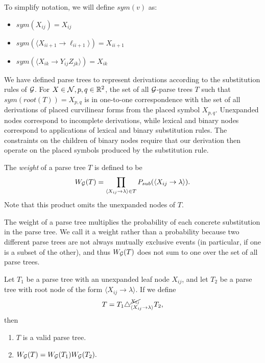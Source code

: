 To simplify notation, we will define $sym(v)$ as:
\begin{itemize}
\item $sym(X_{ij}) = X_{ij}$
\item $sym(\langle X_{i i+1} \to \ell_{i i+1}\rangle) = X_{i i+1}$
\item $sym(\langle X_{ik} \to Y_{ij} Z_{jk}\rangle) = X_{i k}$
\end{itemize}

We have defined parse trees to represent derivations according to the
substitution rules of ${\mathcal G}$.  For $X\in {\mathcal N}, p,q\in \mathbb{R}^2$, the set
of all ${\mathcal G}$-parse trees $T$ such that $sym(root(T)) = X_{p,q}$ is in
one-to-one correspondence with the set of all derivations of placed
curvilinear forms from the placed symbol $X_{p,q}$. Unexpanded nodes
correspond to incomplete derivations, while lexical and binary nodes
correspond to applications of lexical and binary substitution
rules. The constraints on the children of binary nodes require that
our derivation then operate on the placed symbols produced by the
substitution rule.

\begin{defn}
The \emph{weight} of a parse tree $T$ is defined to be
$$ W_{{\mathcal G}}(T) = \prod_{\langle X_{ij} \to \lambda \rangle\in T} P_{sub}(
\langle X_{ij} \to \lambda \rangle).$$ Note that this product omits
the unexpanded nodes of $T$.
\end{defn}

The weight of a parse tree multiplies the probability of each concrete
substitution in the parse tree.  We call it a weight rather than a
probability because two different parse trees are not always mutually
exclusive events (in particular, if one is a subset of the other), and
thus $W_{{\mathcal G}}(T)$ does not sum to one over the set of all parse trees.

\begin{obs}
Let $T_1$ be a parse tree with an unexpanded leaf node $X_{ij}$, and let
$T_2$ be a parse tree with root node of the form $\langle X_{ij} \to
\lambda \rangle$. If we define
$$T = T_1 \triangle^{\cancel{X_{ij}}}_{\langle X_{ij} \to \lambda
  \rangle} T_2,$$
then
\begin{enumerate}
\item $T$ is a valid parse tree.
\item $W_{{\mathcal G}}(T) = W_{{\mathcal G}}(T_1) W_{{\mathcal G}}(T_2).$
\end{enumerate}
\end{obs}


